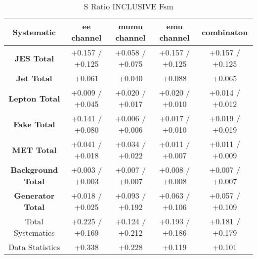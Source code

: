 \begin{table}[htbp]
\scriptsize
  \begin{center} 
  \begin{tabular}{|c|c|c|c|c|}
  \hline
   Systematic                            &  ee channel&  mumu channel&  emu channel&  combinaton\\
 \hline
\textbf{JES Total}                    &+0.157   / +0.125   & +0.058   / +0.075   & +0.157   / +0.125   & +0.157   / +0.125  \\
\textbf{Jet Total}                    &+0.061              & +0.040              & +0.088              & +0.065             \\
\textbf{Lepton Total}                 &+0.009   / +0.045   & +0.020   / +0.017   & +0.020   / +0.010   & +0.014   / +0.012  \\
\textbf{Fake Total}                   &+0.141   / +0.080   & +0.006   / +0.006   & +0.017   / +0.010   & +0.019   / +0.019  \\
\textbf{MET Total}                    &+0.041   / +0.018   & +0.034   / +0.022   & +0.011   / +0.007   & +0.011   / +0.009  \\
\textbf{Background Total}             &+0.003   / +0.003   & +0.007   / +0.007   & +0.008   / +0.008   & +0.007   / +0.007  \\
\textbf{Generator Total}              &+0.018   / +0.025   & +0.093   / +0.192   & +0.063   / +0.106   & +0.057   / +0.109  \\
  \hline
  \hline
Total Systematics                     &+0.225   / +0.169   & +0.124   / +0.212   & +0.193   / +0.186   & +0.181   / +0.179  \\
Data Statistics                       &+0.338              & +0.228              & +0.119              & +0.101             \\     
  \hline
  \end{tabular}
  \end{center} 
  \label{tab:fsm_nominal_sratio}
  \caption{S Ratio INCLUSIVE Fsm}
\end{table}

